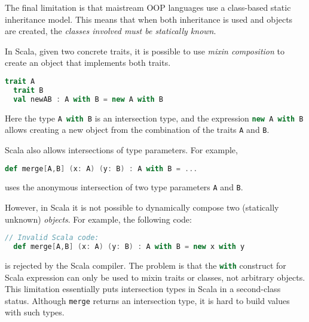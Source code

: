 The final limitation is that maistream OOP languages use a class-based static
inheritance model. This means that when both inheritance is used and objects are
created, the \emph{classes involved must be statically known}.
\begin{comment}
Intersection types date back as early as Coppo et al.'s
work~\cite{coppo1981functional}. Since then researchers have studied
intersection types, and some languages have adopted them in one form or another.

In Java, for example,
\begin{lstlisting}[language=java]
  interface AwithB extends A, B {}
\end{lstlisting}
introduces a new interface \lstinline$AwithB$ that satisfies the interface of
both \lstinline{A} and \lstinline{B}. 
\end{comment}
In Scala, given two concrete traits, it is
possible to use \textit{mixin composition} to create an object that implements
both traits.
\begin{lstlisting}[language=scala]
  trait A
  trait B
  val newAB : A with B = new A with B
\end{lstlisting}
\noindent Here the type \lstinline[language=scala]{A with B} is an intersection type,
and the expression \lstinline[language=scala]{new A with B} allows creating a new
object from the combination of the traits \lstinline{A} and
\lstinline{B}.

Scala also allows intersections of type parameters. For example,
\begin{lstlisting}[language=scala]
  def merge[A,B] (x: A) (y: B) : A with B = ...
\end{lstlisting}
uses the anonymous intersection of two type parameters \lstinline{A} and
\lstinline{B}.

However, in Scala it is not possible to dynamically compose two
(statically unknown) \emph{objects}. For
example, the following code:
\begin{lstlisting}[language=scala]
  // Invalid Scala code:
  def merge[A,B] (x: A) (y: B) : A with B = new x with y
\end{lstlisting}
is rejected by the Scala compiler. The problem is that the \lstinline[language=scala]$with$
construct for Scala expression can only be used to mixin traits or classes, not
arbitrary objects. This limitation essentially puts intersection types in Scala
in a second-class status. Although \lstinline{merge} returns an intersection
type, it is hard to build values with such types.


